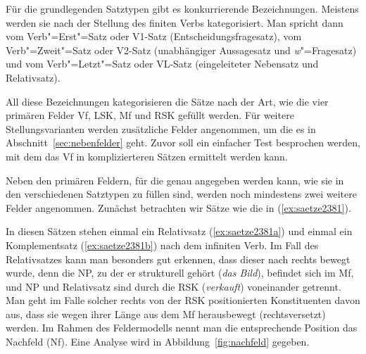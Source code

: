 
\begin{sloppypar}
Für die grundlegenden Satztypen gibt es konkurrierende Bezeichnungen.
Meistens werden sie nach der Stellung des finiten Verbs kategorisiert.
Man spricht dann vom Verb"=Erst"=Satz oder V1-Satz (Entscheidungsfragesatz), vom Verb"=Zweit"=Satz oder V2-Satz (unabhängiger Aussagesatz und \textit{w}"=Fragesatz) und vom Verb"=Letzt"=Satz oder VL-Satz (eingeleiteter Nebensatz und Relativsatz).
\end{sloppypar}

All diese Bezeichnungen kategorisieren die Sätze nach der Art, wie die vier primären Felder Vf, LSK, Mf und RSK gefüllt werden.
Für weitere Stellungsvarianten werden zusätzliche Felder angenommen, um die es in Abschnitt~\ref{sec:nebenfelder} geht.
Zuvor soll ein einfacher Test besprochen werden, mit dem das Vf in komplizierteren Sätzen ermittelt werden kann.

Neben den primären Feldern, für die genau angegeben werden kann, wie sie in den verschiedenen Satztypen zu füllen sind, werden noch mindestens zwei weitere Felder angenommen.
Zunächst betrachten wir Sätze wie die in (\ref{ex:saetze2381}).

\begin{exe}
  \ex\label{ex:saetze2381}
  \begin{xlist}
  \end{xlist}
\end{exe}


In diesen Sätzen stehen einmal ein Relativsatz (\ref{ex:saetze2381a}) und einmal ein Komplementsatz (\ref{ex:saetze2381b}) nach dem infiniten Verb.
Im Fall des Relativsatzes kann man besonders gut erkennen, dass dieser nach rechts bewegt wurde, denn die NP, zu der er strukturell gehört (\textit{das Bild}), befindet sich im Mf, und NP und Relativsatz sind durch die RSK (\textit{verkauft}) voneinander getrennt.
Man geht im Falle solcher rechts von der RSK positionierten Konstituenten davon aus, dass sie wegen ihrer Länge aus dem Mf herausbewegt (rechtsversetzt) werden.
Im Rahmen des Feldermodells nennt man die entsprechende Position das Nachfeld (Nf).
Eine Analyse wird in Abbildung~\ref{fig:nachfeld} gegeben.

